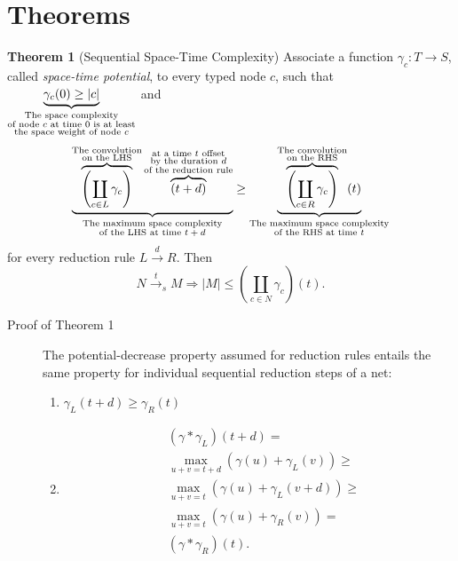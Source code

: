 \documentclass{fit-teorsem}
\begin{document}
\section*{Theorems}
\textbf{Theorem 1} (Sequential Space-Time Complexity) Associate a function $\gamma_c : T \to S$,
called \textit{space-time potential}, to every typed node $c$, such that
$\underbrace{\gamma_c(0) \ge |c|}_{\begin{subarray}{c}
	\text{The space complexity} \\
	\text{of node $c$ at time $0$ is at least} \\
	\text{the space weight of node $c$}
\end{subarray}}$ and \[
	\underbrace{\overbrace{\left(\coprod_{c \in L} \gamma_c\right)}^{\begin{subarray}{c}
			\text{The convolution} \\
			\text{on the LHS}
		\end{subarray}}\overbrace{(t + d)}^{\begin{subarray}{c}
			\text{at a time $t$ offset} \\
			\text{by the duration $d$} \\
			\text{of the reduction rule}
		\end{subarray}}}_{
	\begin{subarray}{c}
		\text{The maximum space complexity} \\
		\text{of the LHS at time $t + d$}
	\end{subarray}}
		\ge \underbrace{\overbrace{\left(\coprod_{c \in R} \gamma_c\right)}^{\begin{subarray}{c}
				\text{The convolution} \\
				\text{on the RHS}
			\end{subarray}}(t)}_{
		\begin{subarray}{c}
			\text{The maximum space complexity} \\
			\text{of the RHS at time $t$}
		\end{subarray}}
\] for every reduction rule $L \stackrel{d}{\longrightarrow} R$. Then \[
	N \stackrel{t}{\longrightarrow}_s M
		\Longrightarrow |M| \le \left(\coprod_{c \in N} \gamma_c\right)(t)
.\]

\begin{description}
	\item[Proof of Theorem 1] The potential-decrease property assumed for reduction rules
		entails the same property for individual sequential reduction steps of a net:
		\begin{enumerate}
			\item $\gamma_L (t + d) \ge \gamma_R (t)$
			\item \begin{align*}
					& (\gamma \ast \gamma_L) (t + d) = \\
					& \max_{u + v = t + d} (\gamma(u) + \gamma_L(v)) \ge \\
					& \max_{u + v = t} (\gamma(u) + \gamma_L(v + d)) \ge \\
					& \max_{u + v = t} (\gamma(u) + \gamma_R(v)) = \\
					& (\gamma \ast \gamma_R)(t)
				.\end{align*}
		\end{enumerate}
\end{description}
\end{document}
